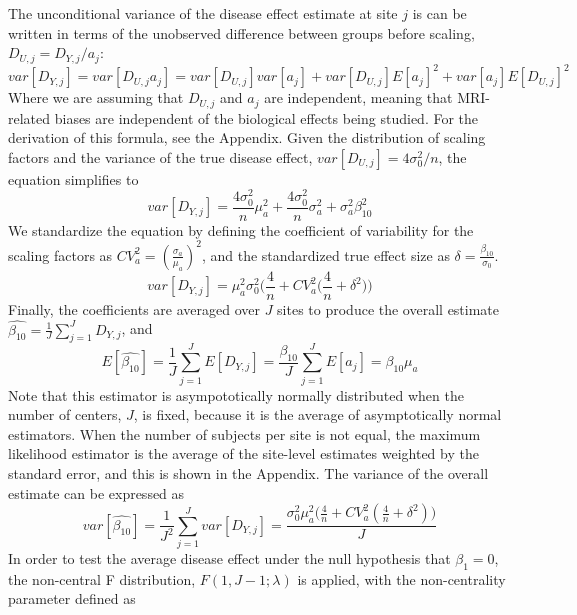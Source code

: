 \documentclass{article}
\begin{document}
The unconditional variance of the disease effect estimate at site $j$ is can be written in terms of the unobserved difference between groups before scaling, $D_{U,j}=D_{Y,j}/a_j$:
\begin{equation}
var[D_{Y,j}] = var[D_{U,j}a_j] = var[D_{U,j}]var[a_j]+var[D_{U,j}]E[a_j]^2+var[a_j]E[D_{U,j}]^2
\end{equation}
Where we are assuming that $D_{U,j}$ and $a_j$ are independent, meaning that MRI-related biases are independent of the biological effects being studied. For the derivation of this formula, see the Appendix. Given the distribution of scaling factors and the variance of the true disease effect, $var[D_{U,j}] = 4\sigma_0^2/n$, the equation simplifies to
\begin{equation}
var[D_{Y,j}] = \frac{4\sigma_0^2}{n}\mu_{a}^2 + \frac{4\sigma_0^2}{n}\sigma_{a}^2 + \sigma_{a}^2\beta_{10}^2
\label{var_unobserved}
\end{equation}
We standardize the equation by defining the coefficient of variability for the scaling factors as $CV_{a}^2 = ({\frac{\sigma_{a}}{\mu_{a}}})^2$, and the standardized true effect size as $\delta = \frac{\beta_{10}}{\sigma_0}$.
\begin{equation}
var[D_{Y,j}] =\mu_a^2\sigma_0^2\Big(\frac{4}{n} + CV_{a}^2\Big(\frac{4}{n} + \delta^2\Big)\Big)
\end{equation}
Finally, the coefficients are averaged over $J$ sites to produce the overall estimate $\hat{\beta_{10}}=\frac{1}{J} \sum_{j=1}^J D_{Y,j}$, and
\begin{equation}
\label{avgest}
E[\hat{\beta_{10}}] = \frac{1}{J}\sum\limits_{j=1}^J{E[D_{Y,j}]} = \frac{\beta_{10}}{J}\sum\limits_{j=1}^J{E[a_j]} = \beta_{10}\mu_{a}
\end{equation}
Note that this estimator is asympototically normally distributed when the number of centers, $J$, is fixed, because it is the average of asymptotically normal estimators. When the number of subjects per site is not equal, the maximum likelihood estimator is the average of the site-level estimates weighted by the standard error, and this is shown in the Appendix. The variance of the overall estimate can be expressed as
\begin{equation}
\label{avgvar}
var[\hat{\beta_{10}}] = \frac{1}{J^2}\sum\limits_{j=1}^{J}{var[D_{Y,j}]} = \frac{\sigma_0^2\mu_a^2\Big(\frac{4}{n} + CV_{a}^2(\frac{4}{n} + \delta^2)\Big)}{J}
\end{equation}
In order to test the average disease effect under the null hypothesis that $\beta_{1} = 0$, the non-central F distribution,  $F(1,J-1; \lambda)$ \cite{Raudenbush2000} is applied, with the non-centrality parameter defined as
\end{document}
